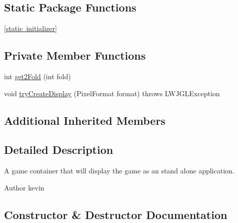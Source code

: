 \subsection*{Static Package Functions}
\begin{DoxyCompactItemize}
\item 
\mbox{\hyperlink{classorg_1_1newdawn_1_1slick_1_1_app_game_container_ab05f71018c94cee7a6c1a6df7f6efee5}{\mbox{[}static initializer\mbox{]}}}
\end{DoxyCompactItemize}
\subsection*{Private Member Functions}
\begin{DoxyCompactItemize}
\item 
int \mbox{\hyperlink{classorg_1_1newdawn_1_1slick_1_1_app_game_container_afb2ee604fe80d51043a90848472a7e11}{get2\+Fold}} (int fold)
\item 
void \mbox{\hyperlink{classorg_1_1newdawn_1_1slick_1_1_app_game_container_a8e3abb23c231a0262715aa22dea9f3bd}{try\+Create\+Display}} (Pixel\+Format format)  throws L\+W\+J\+G\+L\+Exception 
\end{DoxyCompactItemize}
\subsection*{Additional Inherited Members}


\subsection{Detailed Description}
A game container that will display the game as an stand alone application.

\begin{DoxyAuthor}{Author}
kevin 
\end{DoxyAuthor}


\subsection{Constructor \& Destructor Documentation}
\mbox{\label{classorg_1_1newdawn_1_1slick_1_1_app_game_container_a17e6802ced18c1290dbc27fa5faa7221}} 
